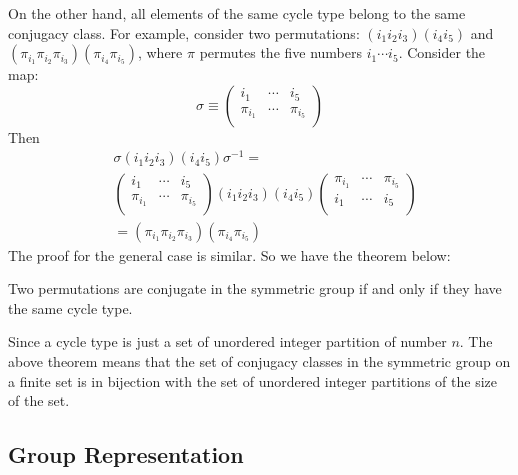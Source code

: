 On the other hand, all elements of the same cycle type belong to the
same conjugacy class. For example, consider two permutations:
$(i_1 i_2 i_3)(i_4 i_5)$ and $\left(\pi_{i_1}
\pi_{i_2}\pi_{i_3}\right)\left(\pi_{i_4}\pi_{i_5}\right)$, where $\pi$
permutes the five numbers $i_1 \cdots i_5$.
Consider the map:
\begin{equation}
    \sigma \equiv \left( \begin{array}{ccc}
            i_1      & \cdots & i_5 \\
            \pi_{i_1} & \cdots & \pi_{i_5} \\
        \end{array} \right)
\end{equation}
Then \begin{align*}
    &\sigma (i_1 i_2 i_3)(i_4 i_5) \sigma^{-1} =  \\
    &\left( \begin{array}{ccc}
            i_1      & \cdots & i_5 \\
            \pi_{i_1} & \cdots & \pi_{i_5} \\
        \end{array} \right)
        (i_1 i_2 i_3)(i_4 i_5)
        \left( \begin{array}{ccc}
            \pi_{i_1} & \cdots & \pi_{i_5} \\
            i_1      & \cdots & i_5 \\
        \end{array} \right) \\
    & = (\pi_{i_1} \pi_{i_2}\pi_{i_3})(\pi_{i_4}\pi_{i_5})
\end{align*}
The proof for the general case is similar. So we have the theorem
below:
\begin{thm}
    Two permutations are conjugate in the symmetric group if and only if they have the same cycle type.
\end{thm}
\begin{remark}
    Since a cycle type is just a set of unordered integer partition of
    number $n$. The above theorem means that the set of conjugacy
    classes in the symmetric group on a finite set is in bijection
    with the set of unordered integer partitions of the size of the
    set. 
\end{remark}

\subsection{Group Representation}
\label{sec:Group-Representation}

